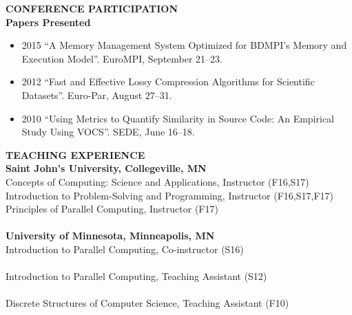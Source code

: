 \documentclass[a4paper,12pt]{article}
\newcommand{\lskip}[1]{\hspace*{1em}\\[#1\baselineskip]}
\newenvironment{Itemize}[0]{
  \vspace{-\parskip}\begin{itemize}\interlinepenalty10000
}{
  \end{itemize}
}
\begin{document}
\textbf{CONFERENCE PARTICIPATION}
\lskip{1}
%
\textbf{Papers Presented}
\begin{Itemize}
  \item[2015] ``A Memory Management System Optimized for BDMPI's Memory and
              Execution Model''. EuroMPI, September 21--23.

  \item[2012] ``Fast and Effective Lossy Compression Algorithms for Scientific
              Datasets''. Euro-Par, August 27--31.

  \item[2010] ``Using Metrics to Quantify Similarity in Source Code: An
              Empirical Study Using VOCS''. SEDE, June 16--18.
\end{Itemize}


\textbf{TEACHING EXPERIENCE}
\lskip{1}
%
\textbf{Saint John's University, Collegeville, MN}\\
%
Concepts of Computing: Science and Applications, Instructor (F16,S17)\\
%
Introduction to Problem-Solving and Programming, Instructor (F16,S17,F17)\\
%
Principles of Parallel Computing, Instructor (F17)\\
%
\lskip{0}
%
\textbf{University of Minnesota, Minneapolis, MN}\\
%
Introduction to Parallel Computing, Co-instructor (S16)\\
  \hspace*{1em}{\footnotesize Design and deliver weekly lectures, design and
    grade assignments, and hold office hours.}\\
%
Introduction to Parallel Computing, Teaching Assistant (S12)\\
  \hspace*{1em}{\footnotesize Gave two guest lectures, held office hours, and
    graded assignments.}\\
%
Discrete Structures of Computer Science, Teaching Assistant (F10)\\
  \hspace*{1em}{\footnotesize Lead weekly recitations, held office hours, and
    graded assignments.}%
%
%
%
%
%
%
\end{document}
